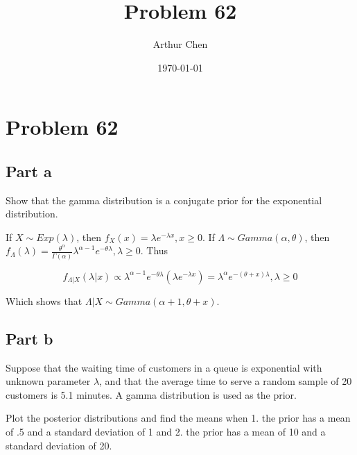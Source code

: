 \documentclass{article}
\author{Arthur Chen}
\title{Problem 62}
\date{\today}
\begin{document}
\section*{Problem 62}

\subsection*{Part a}

Show that the gamma distribution is a conjugate prior for the exponential distribution.

If $X \sim Exp(\lambda)$, then $f_X(x) = \lambda e^{-\lambda x}, x \geq 0$. If $\Lambda \sim Gamma(\alpha, \theta)$, then $f_\Lambda(\lambda) = \frac{\theta^\alpha}{\Gamma(\alpha)} \lambda^{\alpha-1}e^{-\theta \lambda}, \lambda \geq 0$. Thus

\[
f_{\Lambda|X}(\lambda|x) \propto \lambda^{\alpha-1}e^{-\theta\lambda} (\lambda e^{-\lambda x}) = \lambda^\alpha e^{-(\theta + x)\lambda}, \lambda \geq 0
\]

Which shows that $\Lambda|X \sim Gamma(\alpha+1, \theta+x)$.

\subsection*{Part b}

Suppose that the waiting time of customers in a queue is exponential with unknown parameter $\lambda$, and that the average time to serve a random sample of 20 customers is 5.1 minutes. A gamma distribution is used as the prior.

Plot the posterior distributions and find the means when 1. the prior has a mean of .5 and a standard deviation of 1 and 2. the prior has a mean of 10 and a standard deviation of 20.
\end{document}
